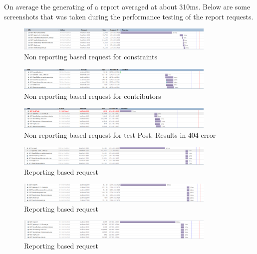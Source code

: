 \documentclass[hidelinks, 12pt, oneside]{article}
\begin{document}
\begin{enumerate}
On average the generating of a report averaged at about 310ms. Below are some screenshots that was taken during the performance testing of the report requests. 

\begin{figure}[h!]
  \centering
    \includegraphics[width=0.85\textwidth]{performance1}
    \caption{Non reporting based request for constraints}
\end{figure}

\begin{figure}[h!]
  \centering
    \includegraphics[width=0.85\textwidth]{performance2}
    \caption{Non reporting based request for contributors}
\end{figure}

\begin{figure}[h!]
  \centering
    \includegraphics[width=0.85\textwidth]{performance3}
    \caption{Non reporting based request for test Post. Results in 404 error}
\end{figure}

\begin{figure}[h!]
  \centering
    \includegraphics[width=0.85\textwidth]{performanceR1}
    \caption{Reporting based request}
\end{figure}

\begin{figure}[h!]
  \centering
    \includegraphics[width=0.85\textwidth]{performanceR2}
    \caption{Reporting based request}
\end{figure}

\begin{figure}[h!]
  \centering
    \includegraphics[width=0.85\textwidth]{performanceR3}
    \caption{Reporting based request}
\end{figure} 
 

\end{enumerate}
\end{document}

